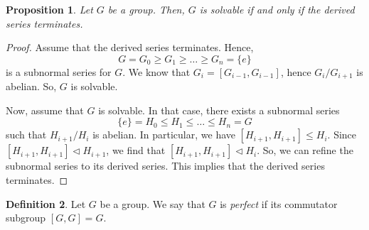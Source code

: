\documentclass[a4paper, openany]{memoir}
\theoremstyle{definition}
\newtheorem{definition}{Definition}[section]
\theoremstyle{plain}
\newtheorem{proposition}[definition]{Proposition}
\begin{document}
    \begin{proposition}
        Let $G$ be a group. Then, $G$ is solvable if and only if the derived series terminates.
    \end{proposition}
    \begin{proof}
        Assume that the derived series terminates. Hence,
        \[G = G_0 \geq G_1 \geq \dots \geq G_n = \{e\}\]
        is a subnormal series for $G$. We know that $G_i = [G_{i-1}, G_{i-1}]$, hence $G_i/G_{i+1}$ is abelian. So, $G$ is solvable.

        Now, assume that $G$ is solvable. In that case, there exists a subnormal series
        \[\{e\} = H_0 \leq H_1 \leq \dots \leq H_n = G\]
        such that $H_{i+1}/H_i$ is abelian. In particular, we have $[H_{i+1}, H_{i+1}] \leq H_i$. Since $[H_{i+1}, H_{i+1}] \vartriangleleft H_{i+1}$, we find that $[H_{i+1}, H_{i+1}] \vartriangleleft H_i$. So, we can refine the subnormal series to its derived series. This implies that the derived series terminates.
    \end{proof}

    \begin{definition}
        Let $G$ be a group. We say that $G$ is \emph{perfect} if its commutator subgroup $[G, G] = G$.
    \end{definition}
\end{document}
